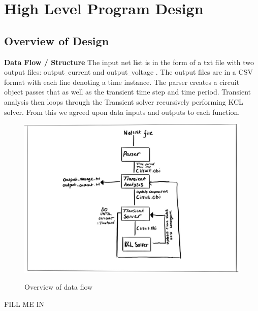 \documentclass{article}
\begin{document}
\section{High Level Program Design }
\subsection{Overview of Design}
\textbf{Data Flow / Structure}
\newline
The input net list is in the form of a txt file with two output files: output\verb|_|current and output\verb|_|voltage . The output files are in a CSV format with each line denoting a time instance. The parser creates a circuit object passes that as well as the transient time step and time period. Transient analysis then loops through the Transient solver recursively performing KCL solver. From this we agreed upon data inputs and outputs to each function.

\begin{figure}[h]
    \caption{Overview of data flow}
    \centering
    \includegraphics[width=\textwidth]{images/Comphpp.jpg}
    \label{fig:AlgoOverview}
\end{figure}

FILL ME IN

\newpage
\end{document}
